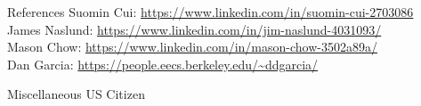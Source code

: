 \documentclass{resume} %
\begin{document}
\begin{rSection}{References}
Suomin Cui: \url{https://www.linkedin.com/in/suomin-cui-2703086} \\
James Naslund: \url{https://www.linkedin.com/in/jim-naslund-4031093/} \\
Mason Chow: \url{https://www.linkedin.com/in/mason-chow-3502a89a/} \\
Dan Garcia: \url{https://people.eecs.berkeley.edu/~ddgarcia/}
\end{rSection}

\begin{rSection}{Miscellaneous}
US Citizen
\end{rSection}
\end{document}
